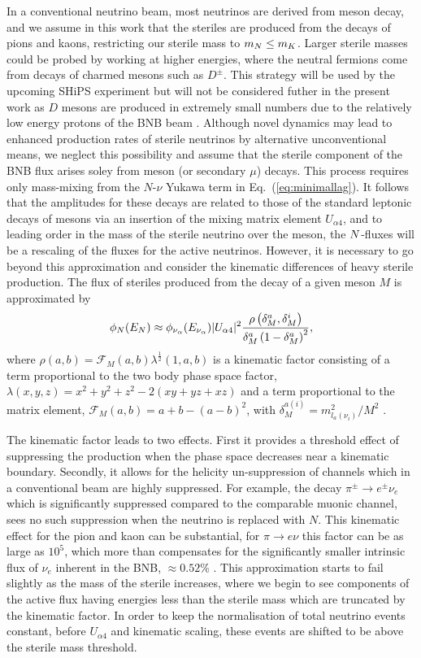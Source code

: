 \documentclass[11pt, a4paper]{article}
\newcommand{\refeq}[1]{Eq.~(\ref{#1})}
\def\ster{\ensuremath N}
\begin{document}
In a conventional neutrino beam, most neutrinos are derived from meson decay,
and we assume in this work that the steriles are produced from the decays of
pions and kaons, restricting our sterile mass to $m_\ster \le m_K$.
%
Larger sterile masses could be probed by working at higher energies, where the
neutral fermions come from decays of charmed mesons such as $D^\pm$. This
strategy will be used by the upcoming SHiPS experiment \cite{Alekhin:2015byh,
Anelli:2015pba} but will not be considered futher in the present work as $D$
mesons are produced in extremely small numbers due to the relatively low energy
protons of the BNB beam \cite{AguilarArevalo:2008yp}.
%
Although novel dynamics may lead to enhanced production rates of sterile
neutrinos by alternative unconventional means, we neglect this possibility and
assume that the sterile component of the BNB flux arises soley from meson (or
secondary $\mu$) decays. This process requires only mass-mixing from the
$N$-$\nu$ Yukawa term in \refeq{eq:minimallag}. It follows that the amplitudes
for these decays are related to those of the standard leptonic decays of mesons
via an insertion of the mixing matrix element $U_{\alpha 4}$, and to leading
order in the mass of the sterile neutrino over the meson, the $\ster$-fluxes
will be a rescaling of the fluxes for the active neutrinos. 
%
However, it is necessary to go beyond this approximation and consider the
kinematic differences of heavy sterile production.
%
The flux of steriles produced from the decay of a given meson $M$ is approximated
by
%
\[ \phi_{\ster}(E_{\ster}) \approx \phi_{\nu_\alpha} (E_{\nu_\alpha})\vert
U_{\alpha 4}\vert^2 \frac{\rho\left( \delta_M^a , \delta_M^i
\right)}{\delta_M^a \left(1- \delta_M^a\right)^2},  \]
%
where $\rho(a,b)=\mathcal{F}_M(a,b) \lambda^{\frac{1}{2}}(1,a,b)$ is a
kinematic factor consisting of a term proportional to the two body phase space
factor, $\lambda(x,y,z)=x^2+y^2+z^2-2(x y+yz+x z)$ and a term proportional to
the matrix element, $\mathcal{F}_M(a,b)= a+b -\left(a-b\right)^2$, with
$\delta_M^{a(i)}=m_{l_a(\nu_i)}^2/M^2$ \cite{PhysRevD.24.1232}. 

The kinematic factor leads to two effects. First it provides a threshold effect
of suppressing the production when the phase space decreases near a kinematic
boundary.  Secondly, it allows for the helicity un-suppression of channels
which in a conventional beam are highly suppressed. For example, the decay
$\pi^\pm \to e^\pm \nu_e$ which is significantly suppressed compared to the
comparable muonic channel, sees no such suppression when the neutrino is
replaced with $N$.
%
This kinematic effect for the pion and kaon can be substantial, for $\pi
\rightarrow e \nu$ this factor can be as large as $10^5$, which more than
compensates for the significantly smaller intrinsic flux of $\nu_e$ inherent in
the BNB, $\approx 0.52$\% \cite{AguilarArevalo:2008yp}. This approximation
starts to fail slightly as the mass of the sterile increases, where we begin to
see components of the active flux having energies less than the sterile mass
which are truncated by the kinematic factor. In order to keep the normalisation
of total neutrino events constant, before $U_{\alpha 4}$ and kinematic scaling,
these events are shifted to be above the sterile mass threshold.
\end{document}
